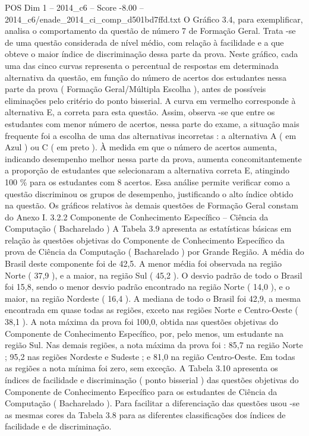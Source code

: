 \begin{textsample}{POS Dim 1 – 2014\_c6 – Score -8.00 – 2014\_c6/enade\_2014\_ci\_comp\_d501bd7ffd.txt}
O Gráfico 3.4, para exemplificar, analisa o comportamento da questão de número 7 de Formação Geral.
Trata -se de uma questão considerada de nível médio, com relação à facilidade e a que obteve o maior índice de discriminação dessa parte da prova.
Neste gráfico, cada uma das cinco curvas representa o percentual de respostas em determinada alternativa da questão, em função do número de acertos dos estudantes nessa parte da prova ( Formação Geral/Múltipla Escolha ), antes de possíveis eliminações pelo critério do ponto bisserial.
A curva em vermelho corresponde à alternativa E, a correta para esta questão.
Assim, observa -se que entre os estudantes com menor número de acertos, nessa parte do exame, a situação mais frequente foi a escolha de uma das alternativas incorretas : a alternativa A ( em Azul ) ou C ( em preto ).
À medida em que o número de acertos aumenta, indicando desempenho melhor nessa parte da prova, aumenta concomitantemente a proporção de estudantes que selecionaram a alternativa correta E, atingindo 100 \% para os estudantes com 8 acertos.
Essa análise permite verificar como a questão discriminou os grupos de desempenho, justificando o alto índice obtido na questão.
Os gráficos relativos às demais questões de Formação Geral constam do Anexo I. 3.2.2 Componente de Conhecimento Específico – Ciência da Computação ( Bacharelado ) A Tabela 3.9 apresenta as estatísticas básicas em relação às questões objetivas do Componente de Conhecimento Específico da prova de Ciência da Computação ( Bacharelado ) por Grande Região.
A média do Brasil deste componente foi de 42,5.
A menor média foi observada na região Norte ( 37,9 ), e a maior, na região Sul ( 45,2 ).
O desvio padrão de todo o Brasil foi 15,8, sendo o menor desvio padrão encontrado na região Norte ( 14,0 ), e o maior, na região Nordeste ( 16,4 ).
A mediana de todo o Brasil foi 42,9, a mesma encontrada em quase todas as regiões, exceto nas regiões Norte e Centro-Oeste ( 38,1 ).
A nota máxima da prova foi 100,0, obtida nas questões objetivas do Componente de Conhecimento Específico, por, pelo menos, um estudante na região Sul.
Nas demais regiões, a nota máxima da prova foi : 85,7 na região Norte ; 95,2 nas regiões Nordeste e Sudeste ; e 81,0 na região Centro-Oeste.
Em todas as regiões a nota mínima foi zero, sem exceção.
A Tabela 3.10 apresenta os índices de facilidade e discriminação ( ponto bisserial ) das questões objetivas do Componente de Conhecimento Específico para os estudantes de Ciência da Computação ( Bacharelado ).
Para facilitar a diferenciação das questões usou -se as mesmas cores da Tabela 3.8 para as diferentes classificações dos índices de facilidade e de discriminação.

\end{textsample}
